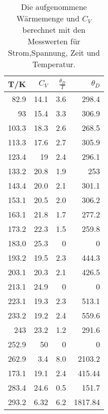 \begin{table}[ht]
    \centering
    \caption{Die aufgenommene Wärmemenge und $C_V$ berechnet mit den Messwerten für Strom,Spannung, Zeit und Temperatur.}
    \begin{tabular}{rrrr}
    \toprule
    T/K & $C_V$ & $\frac{\theta_D}{T}$ & $\theta_D$  \\ 
    \midrule
    82.9 & 14.1& 3.6& 298.4 \\ 
    93   & 15.4& 3.3& 306.9 \\
    103.3& 18.3& 2.6& 268.5 \\
    113.3& 17.6& 2.7& 305.9 \\
    123.4& 19  & 2.4& 296.1 \\
    133.2& 20.8& 1.9& 253   \\
    143.4& 20.0& 2.1& 301.1 \\
    153.1& 20.5& 2.0& 306.2 \\
    163.1& 21.8& 1.7& 277.2 \\
    173.2& 22.3& 1.5& 259.8 \\
    183.0& 25.3& 0  & 0     \\ 
    193.2& 19.5& 2.3& 444.3 \\
    203.1& 20.3& 2.1& 426.5 \\
    213.1& 24.9& 0  & 0     \\ 
    223.1& 19.3& 2.3& 513.1 \\
    233.2& 19.2& 2.4& 559.6 \\
    243  & 23.2& 1.2& 291.6 \\
    252.9& 50  & 0  & 0     \\ 
    262.9& 3.4 & 8.0& 2103.2 \\
    173.1& 19.1& 2.4& 415.44 \\
    283.4& 24.6& 0.5& 151.7 \\
    293.2& 6.32& 6.2& 1817.84 \\
    \bottomrule
    \end{tabular}
    \label{tab:debey2}
\end{table}